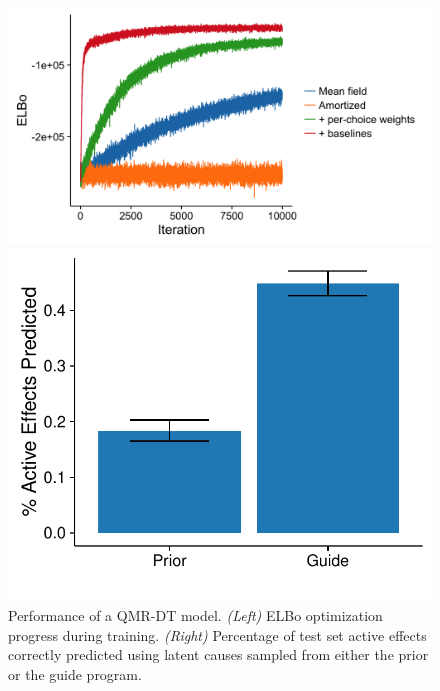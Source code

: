 \begin{figure}[!ht]
\begin{minipage}{0.6\linewidth}
\centering
\includegraphics[width=\linewidth]{figs/results/qmr/elboProgress.png}
\end{minipage}
%
\begin{minipage}{0.4\linewidth}
\centering
\includegraphics[width=\linewidth]{figs/results/qmr/reconstructScores.pdf}
\end{minipage}
\caption{Performance of a QMR-DT model. \emph{(Left)} ELBo optimization progress during training. \emph{(Right)} Percentage of test set active effects correctly predicted using latent causes sampled from either the prior or the guide program.}
\label{fig:qmrResults}
\end{figure}

